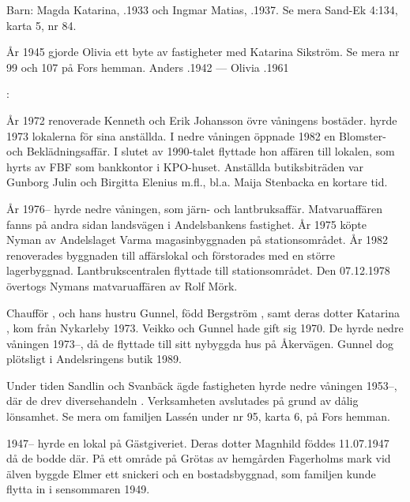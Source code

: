 Barn:	Magda Katarina,	.1933 och Ingmar Matias,	.1937.	Se mera Sand-Ek 4:134, karta 5, nr 84.

År 1945 gjorde Olivia ett byte av fastigheter med Katarina Sikström. Se	mera nr 99 och 107 på Fors hemman.
Anders .1942  ---  Olivia .1961


:

År 1972 renoverade Kenneth och Erik Johansson övre våningens bostäder.  hyrde 1973 lokalerna för sina anställda. I nedre våningen öppnade  1982 en Blomster- och	Beklädningsaffär. I slutet av 1990-talet flyttade hon affären till lokalen,	som hyrts av FBF som bankkontor i KPO-huset. Anställda butiksbiträden	var Gunborg Julin och Birgitta Elenius m.fl., bl.a. Maija Stenbacka en kortare tid.

År 1976-- hyrde  nedre våningen, som järn- och	lantbruksaffär. Matvaruaffären fanns på andra sidan landsvägen i	Andelsbankens fastighet. År 1975 köpte Nyman av Andelslaget Varma magasinbyggnaden på stationsområdet. År 1982 renoverades byggnaden till affärslokal och förstorades med en större lagerbyggnad. 	Lantbrukscentralen flyttade till stationsområdet. Den 07.12.1978 	övertogs Nymans matvaruaffären av Rolf Mörk.

Chaufför ,  och hans hustru Gunnel, född Bergström , samt deras dotter Katarina , kom från Nykarleby 1973. Veikko och Gunnel hade gift sig 1970. De hyrde nedre 	våningen 1973--, då de flyttade till sitt nybyggda hus på Åkervägen. Gunnel dog plötsligt i Andelsringens butik 1989.

Under tiden Sandlin och Svanbäck ägde fastigheten hyrde  nedre våningen 1953--, där de drev diversehandeln	. Verksamheten avslutades på grund av dålig lönsamhet. Se mera om familjen Lassén under nr 95, karta 6, på Fors hemman.

1947-- hyrde  en lokal på Gästgiveriet. Deras dotter Magnhild föddes 11.07.1947 då de bodde där.	På ett område på Grötas av hemgården Fagerholms mark vid älven byggde Elmer ett snickeri och en bostadsbyggnad, som familjen kunde flytta in i sensommaren 1949.




